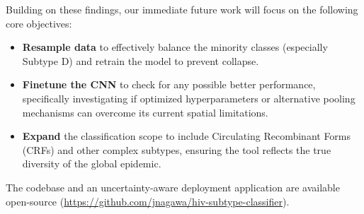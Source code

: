 \documentclass[12pt, a4paper]{article}
\begin{document}
Building on these findings, our immediate future work will focus on the following core objectives:
\begin{itemize}
    \item \textbf{Resample data} to effectively balance the minority classes (especially Subtype D) and retrain the model to prevent collapse.
    \item \textbf{Finetune the CNN} to check for any possible better performance, specifically investigating if optimized hyperparameters or alternative pooling mechanisms can overcome its current spatial limitations.
    \item \textbf{Expand} the classification scope to include Circulating Recombinant Forms (CRFs) and other complex subtypes, ensuring the tool reflects the true diversity of the global epidemic.
\end{itemize}

The codebase and an uncertainty-aware deployment application are available open-source (\url{https://github.com/jnagawa/hiv-subtype-classifier}).



\end{document}
